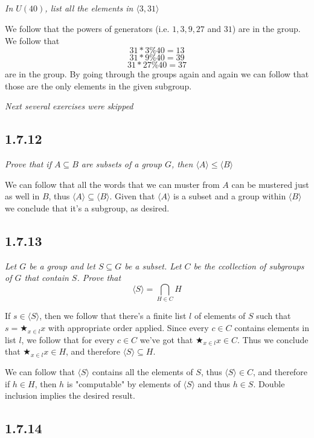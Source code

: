 \documentclass[11pt,oneside,titlepage]{book}
\newcommand{\eangle}[1]{\langle #1 \rangle}
\begin{document}
\subsection{}

\textit{In $U(40)$, list all the elements in $\eangle{3, 31}$}

We follow that the powers of generators (i.e. $1, 3, 9, 27$ and $31$) are in the group.
We follow that
$$31 * 3 \% 40 = 13$$
$$31 * 9 \% 40 = 39$$
$$31 * 27 \% 40 = 37$$
are in the group. By going through the groups again and again we can follow that those are the only
elements in the given subgroup.

\textit{Next several exercises were skipped}

\subsection*{1.7.12}

\textit{Prove that if $A \subseteq B$ are subsets of a group $G$, then $\eangle{A} \leq \eangle{B}$}

We can follow that all the words that we can muster from $A$ can be mustered just as well in $B$,
thus $\eangle{A} \subseteq \eangle{B}$. Given that $\eangle{A}$ is a subset and a group
within $\eangle{B}$ we conclude that it's a subgroup, as desired.

\subsection*{1.7.13}

\textit{Let $G$ be a group and let $S \subseteq G$ be a subset. Let $C$ be the ccollection
  of subgroups of $G$ that contain $S$. Prove that
  $$\eangle{S} = \bigcap_{H \in C}H$$}

If $s \in \eangle{S}$, then we follow that there's a finite list $l$ of elements of
$S$ such that $s = \bigstar_{x \in l}{x}$ with appropriate order applied. Since every
$c \in C$ contains elements in list $l$, we follow that for every $c \in C$ we've got that
$\bigstar_{x \in l}{x} \in C$. Thus we conclude that $\bigstar_{x \in l}{x} \in H$, and therefore
$\eangle{S} \subseteq H$.

We can follow that $\eangle{S}$ contains all the elements of $S$, thus $\eangle{S} \in C$, and
therefore if $h \in H$, then $h$ is "computable" by elements of $\eangle{S}$ and thus $h \in S$.
Double inclusion implies the desired result.

\subsection*{1.7.14}
\end{document}
